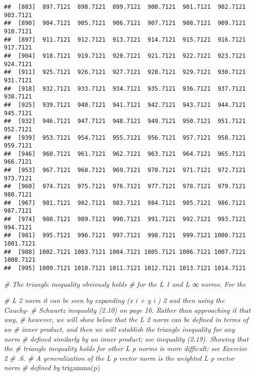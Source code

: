 \documentclass[
]{article}
\newenvironment{Shaded}{\begin{snugshade}}{\end{snugshade}}
\newcommand{\CommentTok}[1]{\textcolor[rgb]{0.56,0.35,0.01}{\textit{#1}}}
\newcommand{\FunctionTok}[1]{\textcolor[rgb]{0.00,0.00,0.00}{#1}}
\newcommand{\NormalTok}[1]{#1}
\begin{document}
\begin{verbatim}
##  [883]  897.7121  898.7121  899.7121  900.7121  901.7121  902.7121  903.7121
##  [890]  904.7121  905.7121  906.7121  907.7121  908.7121  909.7121  910.7121
##  [897]  911.7121  912.7121  913.7121  914.7121  915.7121  916.7121  917.7121
##  [904]  918.7121  919.7121  920.7121  921.7121  922.7121  923.7121  924.7121
##  [911]  925.7121  926.7121  927.7121  928.7121  929.7121  930.7121  931.7121
##  [918]  932.7121  933.7121  934.7121  935.7121  936.7121  937.7121  938.7121
##  [925]  939.7121  940.7121  941.7121  942.7121  943.7121  944.7121  945.7121
##  [932]  946.7121  947.7121  948.7121  949.7121  950.7121  951.7121  952.7121
##  [939]  953.7121  954.7121  955.7121  956.7121  957.7121  958.7121  959.7121
##  [946]  960.7121  961.7121  962.7121  963.7121  964.7121  965.7121  966.7121
##  [953]  967.7121  968.7121  969.7121  970.7121  971.7121  972.7121  973.7121
##  [960]  974.7121  975.7121  976.7121  977.7121  978.7121  979.7121  980.7121
##  [967]  981.7121  982.7121  983.7121  984.7121  985.7121  986.7121  987.7121
##  [974]  988.7121  989.7121  990.7121  991.7121  992.7121  993.7121  994.7121
##  [981]  995.7121  996.7121  997.7121  998.7121  999.7121 1000.7121 1001.7121
##  [988] 1002.7121 1003.7121 1004.7121 1005.7121 1006.7121 1007.7121 1008.7121
##  [995] 1009.7121 1010.7121 1011.7121 1012.7121 1013.7121 1014.7121
\end{verbatim}

\begin{Shaded}
\begin{Highlighting}[]
\CommentTok{\# The triangle inequality obviously holds}
\CommentTok{\# for the L 1 and L ∞ norms. For the}

\CommentTok{\# L 2 norm it can be seen by expanding (x i + y i ) 2 and then using the Cauchy{-}}
\CommentTok{\#  Schwartz inequality (2.10) on page 16. Rather than approaching it that way,}
\CommentTok{\# however, we will show below that the L 2 norm can be defined in terms of an}
\CommentTok{\# inner product, and then we will establish the triangle inequality for any norm}
\CommentTok{\# defined similarly by an inner product; see inequality (2.19). Showing that the}
\CommentTok{\# triangle inequality holds for other L p norms is more diﬃcult; see Exercise 2}
\CommentTok{\# .6.}
\CommentTok{\# A generalization of the L p vector norm is the weighted L p vector norm}
\CommentTok{\# defined by}
\FunctionTok{trigamma}\NormalTok{(p)}
\end{Highlighting}
\end{Shaded}
\end{document}
